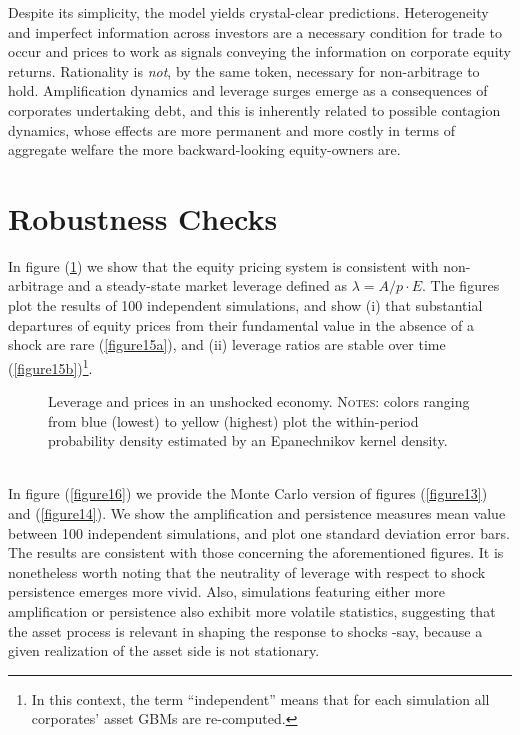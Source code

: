 \documentclass[11pt]{article}
\begin{document}
Despite its simplicity, the model yields crystal-clear predictions. Heterogeneity and imperfect information across investors are a necessary condition for trade to occur and prices to work as signals conveying the information on corporate equity returns. Rationality is \emph{not}, by the same token, necessary for non-arbitrage to hold. Amplification dynamics and leverage surges emerge as a consequences of corporates undertaking debt, and this is inherently related to possible contagion dynamics, whose effects are more permanent and more costly in terms of aggregate welfare the more backward-looking equity-owners are.

\newpage
\appendix
\section{Robustness Checks}
In figure (\ref{figure15}) we show that the equity pricing system is consistent with non-arbitrage and a steady-state market leverage defined as $\lambda = A/p\cdot E$. The figures plot the results of 100 independent simulations, and show (i) that substantial departures of equity prices from their fundamental value in the absence of a shock are rare (\ref{figure15a}), and (ii) leverage ratios are stable over time (\ref{figure15b})\footnote{In this context, the term ``independent'' means that for each simulation all corporates' asset GBMs are re-computed.}.
\begin{figure}[h!]
\centering
{}\quad
{}
 \caption{Leverage and prices in an unshocked economy. \textsc{Notes}: colors ranging from blue (lowest) to yellow (highest) plot the within-period probability density estimated by an Epanechnikov kernel density.} \label{figure15}
\end{figure}\\
In figure (\ref{figure16}) we provide the Monte Carlo version of figures (\ref{figure13}) and (\ref{figure14}). We show the amplification and persistence measures mean value between 100 independent simulations, and plot one standard deviation error bars. The results are consistent with those concerning the aforementioned figures. It is nonetheless worth noting that the neutrality of leverage with respect to shock persistence emerges more vivid. Also, simulations featuring either more amplification or persistence also exhibit more volatile statistics, suggesting that the asset process is relevant in shaping the response to shocks -say, because a given realization of the asset side is not stationary.
\end{document}

